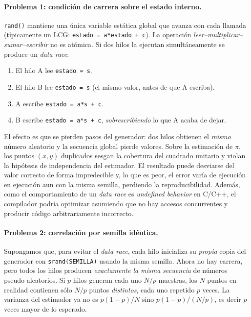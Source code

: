 \documentclass[12pt,a4paper]{article}
\begin{document}
\paragraph{Problema 1: condici\'on de carrera sobre el estado interno.}
\texttt{rand()} mantiene una \'unica variable est\'atica global que avanza con cada llamada (t\'ipicamente un LCG: \texttt{estado = a*estado + c}). La operaci\'on \emph{leer--multiplicar--sumar--escribir} no es at\'omica. Si dos hilos la ejecutan simult\'aneamente se produce un \emph{data race}:

\begin{enumerate}
  \item El hilo A lee \texttt{estado = s}.
  \item El hilo B lee \texttt{estado = s} (el mismo valor, antes de que A escriba).
  \item A escribe \texttt{estado = a*s + c}.
  \item B escribe \texttt{estado = a*s + c}, \emph{sobrescribiendo} lo que A acaba de dejar.
\end{enumerate}

El efecto es que se pierden pasos del generador: dos hilos obtienen el \emph{mismo} n\'umero aleatorio y la secuencia global pierde valores. Sobre la estimaci\'on de $\pi$, los puntos $(x,y)$ duplicados sesgan la cobertura del cuadrado unitario y violan la hip\'otesis de independencia del estimador. El resultado puede desviarse del valor correcto de forma impredecible y, lo que es peor, el error var\'ia de ejecuci\'on en ejecuci\'on aun con la misma semilla, perdiendo la reproducibilidad. Adem\'as, como el comportamiento de un \emph{data race} es \emph{undefined behavior} en C/C++, el compilador podr\'ia optimizar asumiendo que no hay accesos concurrentes y producir c\'odigo arbitrariamente incorrecto.

\paragraph{Problema 2: correlaci\'on por semilla id\'entica.}
Supongamos que, para evitar el \emph{data race}, cada hilo inicializa su \emph{propia} copia del generador con \texttt{srand(SEMILLA)} usando la misma semilla. Ahora no hay carrera, pero todos los hilos producen \emph{exactamente la misma secuencia} de n\'umeros pseudo-aleatorios. Si $p$ hilos generan cada uno $N/p$ muestras, los $N$ puntos en realidad contienen s\'olo $N/p$ puntos \emph{distintos}, cada uno repetido $p$ veces. La varianza del estimador ya no es $p(1{-}p)/N$ sino $p(1{-}p)/(N/p)$, es decir $p$ veces mayor de lo esperado.
\end{document}

